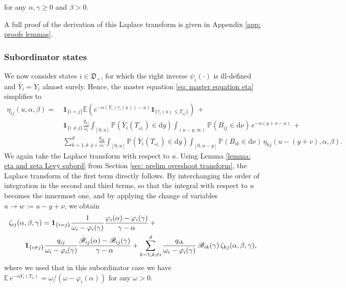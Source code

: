 \documentclass[reqno,12pt]{amsart}
\newcommand{\bs}{\boldsymbol}
\newcommand{\defDplus}{{\mathfrak D}_+}
\begin{document}
for any $\alpha,\gamma \geqslant0$ and $\beta>0$. {A full proof of the derivation of this Laplace transform is given in Appendix \ref{app: proofs lemmas}.


\subsubsection*{Subordinator states}
We now consider states $i\in\defDplus $, for which the right inverse $\psi_i(\cdot)$ is ill-defined and $\bar{Y}_i = Y_i$ almost surely. Hence, the master equation \eqref{eq: master equation eta} simplifies to
\begin{align*}
    \eta_{ij}(u,\alpha,\beta) =\:&  {\bs 1}_{\{i=j\}}\mathbb{E}\left( e^{-\alpha(Y_i(\tau_i(u)) - u)}\bs{1}_{\{\tau_i(u) \leqslant T_{\omega_i}\}}\right) \,+\\
    & {\bs 1}_{\{i\neq j\}}\frac{q_{ij}}{\omega_i} \int_{[0,u]}  \mathbb{P}\left(\bar{Y}_i(T_{\omega_i})\in\mathrm{d}y\right) \int_{(u-y,\infty)} \mathbb{P}\left(B_{ij}\in\mathrm{d}\nu\right)\,e^{-\alpha(y+\nu-u)}\,+\\
    &\sum_{k=1,k\neq i}^d \frac{q_{ik}}{\omega_i} \int_{[0,u]} \mathbb{P}\left(\bar{Y}_i(T_{\omega_i})\in\mathrm{d}y\right) \int_{[0,u-y]} \mathbb{P}\left(B_{ik}\in\mathrm{d}\nu\right)\,\eta_{kj}(u-(y+v), \alpha,\beta).
\end{align*}
We again take the Laplace transform with respect to $u$. {Using Lemma \ref{lemma: eta and zeta Levy subord} from Section \ref{sec: prelim overshoot transform}, the Laplace transform of the first term directly follows.} By interchanging the order of integration in the second and third terms, so that the integral with respect to $u$ becomes the innermost one, and by applying the change of variables $u \to w := u - y + \nu$, we obtain
\begin{align}
    \notag\zeta_{ij}&(\alpha, \beta, \gamma) = {\bs 1}_{\{i = j\}} \frac{1}{\omega_i - \varphi_i(\gamma)} \frac{\varphi_i(\alpha) - \varphi_i(\gamma)}{\gamma - \alpha}\,+ \\
    &\:\:\:\:\:{\bs 1}_{\{i\neq j\}} \frac{q_{ij}}{\omega_i - \varphi_i(\gamma)} \frac{\mathscr{B}_{ij}(\alpha) - \mathscr{B}_{ij}(\gamma)}{\gamma - \alpha} +\sum_{k=1,k\neq i}^d \frac{q_{ik}}{\omega_i - \varphi_i(\gamma)}\,\mathscr{B}_{ik}(\gamma)\,\zeta_{kj}(\alpha,\beta,\gamma), \label{eq: sys eqs sub}
\end{align}
where we used that in this subordinator case we have $\mathbb{E}\,e^{-\alpha \bar{Y}_i(T_{\omega})} = {\omega}/({\omega - \varphi_i(\alpha)})$ for any $\omega > 0$.

}
\end{document}
